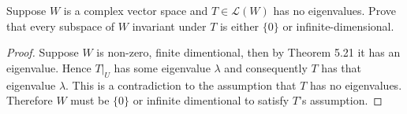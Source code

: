 Suppose $W$ is a complex vector space and $T \in \mathcal{L}(W)$ has no eigenvalues.  Prove that every subspace of $W$ invariant under $T$ is either $\{0\}$ or infinite-dimensional.
\begin{mybox}
    \begin{proof}
        Suppose $W$ is non-zero, finite dimentional, then by Theorem 5.21 it has an eigenvalue. Hence $T|_U$ has some eigenvalue $\lambda$ and consequently $T$ has that eigenvalue $\lambda$. This is a contradiction to the assumption that $T$ has no eigenvalues. Therefore $W$ must be $\{0\}$ or infinite dimentional to satisfy $T$'s assumption.
    \end{proof}
\end{mybox}